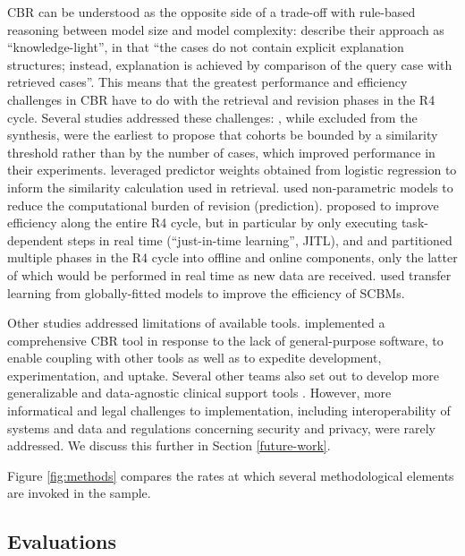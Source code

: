 \documentclass[sn-mathphys,Numbered,pdflatex]{sn-jnl}
\theoremstyle{remark}
\theoremstyle{definition}
\newcommand{\hl}[1]{#1}
\begin{document}
CBR can be understood as the opposite side of a trade-off with
rule-based reasoning between model size and model complexity:
\citet{Doyle2006} describe their approach as ``knowledge-light'', in
that ``the cases do not contain explicit explanation structures;
instead, explanation is achieved by comparison of the query case with
retrieved cases''. This means that the greatest performance and
efficiency challenges in CBR have to do with the retrieval and revision
phases in the R4 cycle. Several studies addressed these challenges:
\citet{Park2006}, while excluded from the synthesis, were the earliest
to propose that cohorts be bounded by a similarity threshold rather than
by the number of cases, which improved performance in their experiments.
\citet{CampilloGimenez2013} leveraged predictor weights obtained from
logistic regression to inform the similarity calculation used in
retrieval. \citet{Lowsky2013} used non-parametric models to reduce the
computational burden of revision (prediction). \citet{Ma2020} proposed
to improve efficiency along the entire R4 cycle, but in particular by
only executing task-dependent steps in real time (``just-in-time
learning'', JITL), and \citet{Ng2021} and \citet{Tang2021} partitioned
multiple phases in the R4 cycle into offline and online components, only
the latter of which would be performed in real time as new data are
received. \citet{Liu2022} used transfer learning from globally-fitted
models to improve the efficiency of \hl{SCBM}s.

Other studies addressed limitations of available tools.
\citet{Lopez2011} implemented a comprehensive CBR tool in response to
the lack of general-purpose software, to enable coupling with other
tools as well as to expedite development, experimentation, and uptake.
Several other teams also set out to develop more generalizable and
data-agnostic clinical support tools
\citep{Elter2007, Liang2015, Ng2015, Zhang2018}. However, more
informatical and legal challenges to implementation, including
interoperability of systems and data and regulations concerning security
and privacy, were rarely addressed. We discuss this further in Section
\ref{future-work}.

Figure \ref{fig:methods} compares the rates at which several
methodological elements are invoked in the sample.

\subsection{Evaluations}\label{evaluations}
\end{document}
